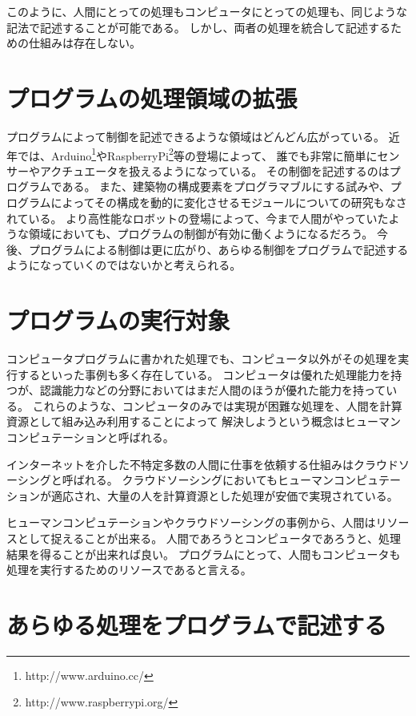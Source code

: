 このように、人間にとっての処理もコンピュータにとっての処理も、同じような記法で記述することが可能である。
しかし、両者の処理を統合して記述するための仕組みは存在しない。

\section{プログラムの処理領域の拡張}\label{ux30d7ux30edux30b0ux30e9ux30e0ux306eux51e6ux7406ux9818ux57dfux306eux62e1ux5f35}

プログラムによって制御を記述できるような領域はどんどん広がっている。
近年では、Arduino\footnote{http://www.arduino.cc/}やRaspberryPi\footnote{http://www.raspberrypi.org/}等の登場によって、
誰でも非常に簡単にセンサーやアクチュエータを扱えるようになっている。
その制御を記述するのはプログラムである。
また、建築物の構成要素をプログラマブルにする試み\cite{squama}や、プログラムによってその構成を動的に変化させるモジュールについての研究もなされている。
より高性能なロボットの登場によって、今まで人間がやっていたような領域においても、プログラムの制御が有効に働くようになるだろう。
今後、プログラムによる制御は更に広がり、あらゆる制御をプログラムで記述するようになっていくのではないかと考えられる。

\section{プログラムの実行対象}\label{ux30d7ux30edux30b0ux30e9ux30e0ux306eux5b9fux884cux5bfeux8c61}

コンピュータプログラムに書かれた処理でも、コンピュータ以外がその処理を実行するといった事例も多く存在している。
コンピュータは優れた処理能力を持つが、認識能力などの分野においてはまだ人間のほうが優れた能力を持っている。
これらのような、コンピュータのみでは実現が困難な処理を、人間を計算資源として組み込み利用することによって
解決しようという概念はヒューマンコンピュテーション\cite{humancomputation}と呼ばれる。

インターネットを介した不特定多数の人間に仕事を依頼する仕組みはクラウドソーシングと呼ばれる。
クラウドソーシングにおいてもヒューマンコンピュテーションが適応され、大量の人を計算資源とした処理が安価で実現されている。

ヒューマンコンピュテーションやクラウドソーシングの事例から、人間はリソースとして捉えることが出来る。
人間であろうとコンピュータであろうと、処理結果を得ることが出来れば良い。
プログラムにとって、人間もコンピュータも処理を実行するためのリソースであると言える。

\section{あらゆる処理をプログラムで記述する}\label{ux3042ux3089ux3086ux308bux51e6ux7406ux3092ux30d7ux30edux30b0ux30e9ux30e0ux3067ux8a18ux8ff0ux3059ux308b}

